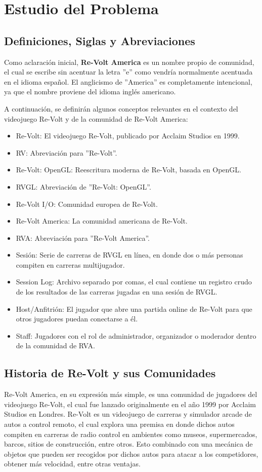 \chapter{Estudio del Problema}

\section{Definiciones, Siglas y Abreviaciones}
Como aclaración inicial, \textbf{Re-Volt America} es un nombre propio de comunidad, el cual se escribe sin acentuar la letra ''e'' como vendría normalmente acentuada en el idioma español. El anglicismo de ''America'' es completamente intencional, ya que el nombre proviene del idioma inglés americano.

A continuación, se definirán algunos conceptos relevantes en el contexto del videojuego Re-Volt y de la comunidad de Re-Volt America:

\begin{itemize}
	\item Re-Volt: El videojuego Re-Volt, publicado por Acclaim Studios en 1999.
	\item RV: Abreviación para ''Re-Volt''.
	\item Re-Volt: OpenGL: Reescritura moderna de Re-Volt, basada en OpenGL.
	\item RVGL: Abreviación de ''Re-Volt: OpenGL''.
	\item Re-Volt I/O: Comunidad europea de Re-Volt.
	\item Re-Volt America: La comunidad americana de Re-Volt.
	\item RVA: Abreviación para ''Re-Volt America''.
	\item Sesión: Serie de carreras de RVGL en línea, en donde dos o más personas compiten en carreras multijugador.
	\item Session Log: Archivo separado por comas, el cual contiene un registro crudo de los resultados de las carreras jugadas en una sesión de RVGL.
 	\item Host/Anfitrión: El jugador que abre una partida online de Re-Volt para que otros jugadores puedan conectarse a él.
 	\item Staff: Jugadores con el rol de administrador, organizador o moderador dentro de la comunidad de RVA.
\end{itemize}

\section{Historia de Re-Volt y sus Comunidades}
Re-Volt America, en su expresión más simple, es una comunidad de jugadores del videojuego Re-Volt, el cual fue lanzado originalmente en el año 1999 por Acclaim Studios en Londres. Re-Volt es un videojuego de carreras y simulador arcade de autos a control remoto, el cual explora una premisa en donde dichos autos compiten en carreras de radio control en ambientes como museos, supermercados, barcos, sitios de construcción, entre otros. Esto combinado con una mecánica de objetos que pueden ser recogidos por dichos autos para atacar a los competidores, obtener más velocidad, entre otras ventajas.

